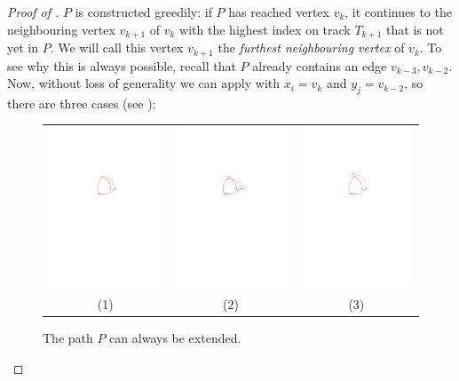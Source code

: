 \documentclass{patmorin}
\begin{document}
\begin{proof}[Proof of ]
  $P$ is constructed greedily: if $P$ has reached vertex $v_k$, it continues to the neighbouring vertex 
  $v_{k+1}$ of $v_{k}$ with the highest index on track $T_{k+1}$ that is not yet in $P$.
  We will call this vertex $v_{k+1}$ the \emph{furthest neighbouring vertex} of $v_k$.  To see why this is always possible,
  recall that $P$ already contains an edge $v_{k-3},v_{k-2}$. Now, without loss of generality we can
  apply  with $x_i=v_k$ and $y_j=v_{k-2}$, so there
  are three cases (see ):

\begin{figure}
   \begin{center}
     \begin{tabular}{ccc}
       \includegraphics[width=0.3\columnwidth]{figs/sloppy-1} &
       \includegraphics[width=0.3\columnwidth]{figs/sloppy-2} &
       \includegraphics[width=0.3\columnwidth]{figs/sloppy-3} \\
       (1) & (2) & (3) 
     \end{tabular}
   \end{center}
   \caption{The path $P$ can always be extended.}
\end{figure}



\end{proof}
\end{document}
